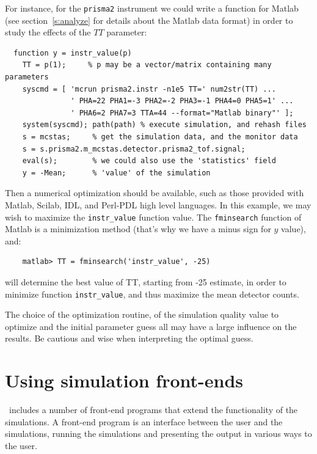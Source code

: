 For instance, for the \verb+prisma2+ instrument we could write a function for Matlab (see section~\ref{s:analyze} for details about the Matlab data format) in order to study the effects of the $TT$ parameter:
\begin{verbatim}
  function y = instr_value(p)
    TT = p(1);     % p may be a vector/matrix containing many parameters 
    syscmd = [ 'mcrun prisma2.instr -n1e5 TT=' num2str(TT) ...
               ' PHA=22 PHA1=-3 PHA2=-2 PHA3=-1 PHA4=0 PHA5=1' ...
               ' PHA6=2 PHA7=3 TTA=44 --format="Matlab binary"' ];
    system(syscmd); path(path) % execute simulation, and rehash files
    s = mcstas;     % get the simulation data, and the monitor data
    s = s.prisma2.m_mcstas.detector.prisma2_tof.signal;
    eval(s);        % we could also use the 'statistics' field
    y = -Mean;      % 'value' of the simulation
\end{verbatim}

Then a numerical optimization should be available, such as those provided with Matlab, Scilab, IDL, and Perl-PDL high level languages. In this example, we may wish to maximize the \verb+instr_value+ function value. The \verb+fminsearch+ function of Matlab is a minimization method (that's why we have a minus sign for $y$ value), and:
\begin{verbatim}
    matlab> TT = fminsearch('instr_value', -25)
\end{verbatim}
will determine the best value of TT, starting from -25 estimate, in order to minimize function \verb+instr_value+, and thus maximize the mean detector counts.

The choice of the optimization routine, of the simulation quality value to optimize 
and the initial parameter guess all may have a large influence on the results. 
Be cautious and wise when interpreting the optimal guess.

\section{Using simulation front-ends}
\label{s:frontends}

\MCS\ includes a number of front-end programs that extend the
functionality of the simulations. A front-end program is an interface
between the user and the simulations, running the simulations and
presenting the output in various ways to the user.

